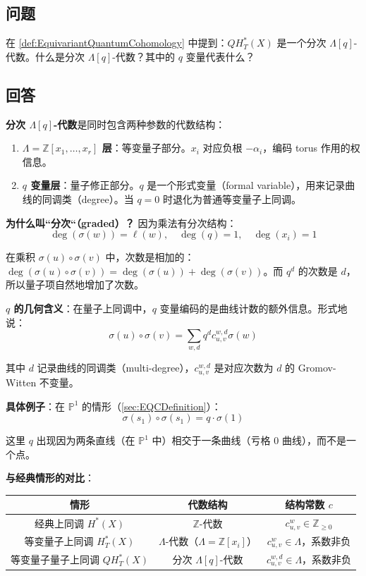 \subsection{问题}
在 \cref{def:EquivariantQuantumCohomology} 中提到：$QH_T^*(X)$ 是一个分次 $\Lambda[q]$-代数。什么是分次 $\Lambda[q]$-代数？其中的 $q$ 变量代表什么？

\subsection{回答}
\textbf{分次 $\Lambda[q]$-代数}是同时包含两种参数的代数结构：

\begin{enumerate}
\item \textbf{$\Lambda = \mathbb{Z}[x_1, \ldots, x_r]$ 层}：等变量子部分。$x_i$ 对应负根 $-\alpha_i$，编码 torus 作用的权信息。

\item \textbf{$q$ 变量层}：量子修正部分。$q$ 是一个形式变量（formal variable），用来记录曲线的同调类（degree）。当 $q = 0$ 时退化为普通等变量子上同调。
\end{enumerate}

\textbf{为什么叫``分次``（graded）？} 因为乘法有分次结构：
$$\deg(\sigma(w)) = \ell(w), \quad \deg(q) = 1, \quad \deg(x_i) = 1$$

在乘积 $\sigma(u) \circ \sigma(v)$ 中，次数是相加的：$\deg(\sigma(u) \circ \sigma(v)) = \deg(\sigma(u)) + \deg(\sigma(v))$。而 $q^d$ 的次数是 $d$，所以量子项自然地增加了次数。

\textbf{$q$ 的几何含义}：在量子上同调中，$q$ 变量编码的是曲线计数的额外信息。形式地说：
$$\sigma(u) \circ \sigma(v) = \sum_{w,d} q^d c_{u,v}^{w,d} \sigma(w)$$

其中 $d$ 记录曲线的同调类（multi-degree），$c_{u,v}^{w,d}$ 是对应次数为 $d$ 的 Gromov-Witten 不变量。

\textbf{具体例子}：在 $\mathbb{P}^1$ 的情形（\cref{sec:EQCDefinition}）：
$$\sigma(s_1) \circ \sigma(s_1) = q \cdot \sigma(1)$$

这里 $q$ 出现因为两条直线（在 $\mathbb{P}^1$ 中）相交于一条曲线（亏格 0 曲线），而不是一个点。

\textbf{与经典情形的对比}：
\begin{center}
\begin{tabular}{c|c|c}
情形 & 代数结构 & 结构常数 $c$ \\ \hline
经典上同调 $H^*(X)$ & $\mathbb{Z}$-代数 & $c_{u,v}^w \in \mathbb{Z}_{\geq 0}$ \\
等变量子上同调 $H_T^*(X)$ & $\Lambda$-代数（$\Lambda = \mathbb{Z}[x_i]$） & $c_{u,v}^w \in \Lambda$，系数非负 \\
等变量子量子上同调 $QH_T^*(X)$ & 分次 $\Lambda[q]$-代数 & $c_{u,v}^{w,d} \in \Lambda$，系数非负 \\
\end{tabular}
\end{center}

